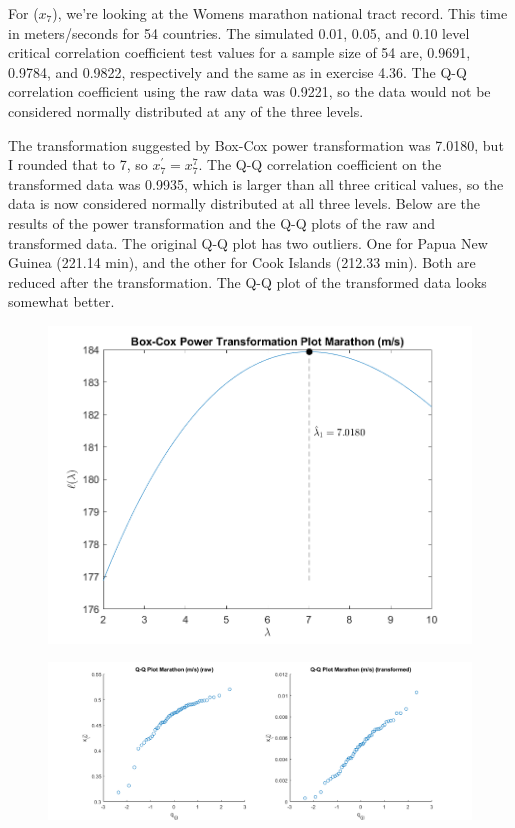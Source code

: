 For ($x_{7}$), we're looking at the Womens marathon national tract record. This time in meters/seconds for 54 countries. The simulated 0.01, 0.05, and 0.10 level critical correlation coefficient test values for a sample size of 54 are, 0.9691, 0.9784, and 0.9822, respectively and the same as in exercise 4.36. The Q-Q correlation coefficient using the raw data was 0.9221, so the data would not be considered normally distributed at any of the three levels.

The transformation suggested by Box-Cox power transformation was 7.0180, but I rounded that to 7, so $x_{7}^{\prime} = x_{7}^{7}$.
The Q-Q correlation coefficient on the transformed data was 0.9935, which is larger than all three critical values, so the data is now considered normally distributed at all three levels.
Below are the results of the power transformation and the Q-Q plots of the raw and transformed data.
The original Q-Q plot has two outliers. One for Papua New Guinea (221.14 min), and the other for Cook Islands (212.33 min). Both are reduced after the transformation. The Q-Q plot of the transformed data looks somewhat better.

\begin{center}
    \begin{figure}[H]
        \centering
        \includegraphics[scale=0.6]{./matlab/chapter-4/sol4.37.power.7.png}
    \end{figure}
\end{center}

\begin{center}
    \begin{figure}[H]
        \centering
        \includegraphics[scale=0.4]{./matlab/chapter-4/sol4.37.qq.7.png}
    \end{figure}
\end{center}

